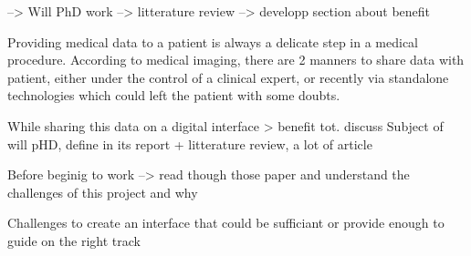 --> Will PhD work 
\newline
--> litterature review
\newline
--> developp section about benefit



Providing medical data to a patient is always a delicate step in a medical procedure. According to medical imaging, there are 2 manners to share data with patient, either under the control of a clinical expert, or recently via standalone technologies which could left the patient with some doubts.  

While sharing this data on a digital interface > benefit tot. discuss
Subject of will pHD, define in its report + litterature review, a lot of article 

Before beginig to work --> read though those paper and understand the challenges of this project and why 


Challenges to create an interface that could be sufficiant or provide enough to guide on the right track